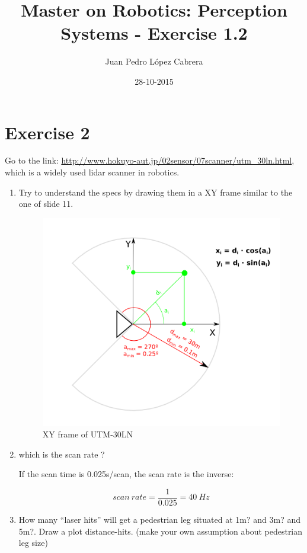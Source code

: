 \documentclass[a4paper]{article}
\title{Master on Robotics: Perception Systems - Exercise 1.2}
\date{28-10-2015}
\author{Juan Pedro López Cabrera}
\begin{document}
  \maketitle

  \newpage

  \section{Exercise 2}
Go to the link: \url{http://www.hokuyo-aut.jp/02sensor/07scanner/utm_30ln.html}, which is a widely used lidar scanner in robotics.
\begin{enumerate}[label=\alph*.]
    \item Try to understand the specs by drawing them in a XY frame similar to the one of slide 11.

    \begin{figure}[ht]
      \centering
      \includegraphics[scale=0.7]{Exercise_1_2_a}
      \caption{XY frame of UTM-30LN}
      \label{fig:xy_frame}
    \end{figure}

    \item which is the scan rate ?

If the scan time is 0.025s/scan, the scan rate is the inverse:

\begin{equation}
{scan\ rate} = \dfrac {1}{0.025} = {40}\ {Hz}
\end{equation}
    \newpage
    \item How many “laser hits” will get a pedestrian leg situated at 1m? and 3m? and 5m?. Draw a plot distance-hits. (make your own
assumption about pedestrian leg size)


\end{enumerate}
\end{document}
